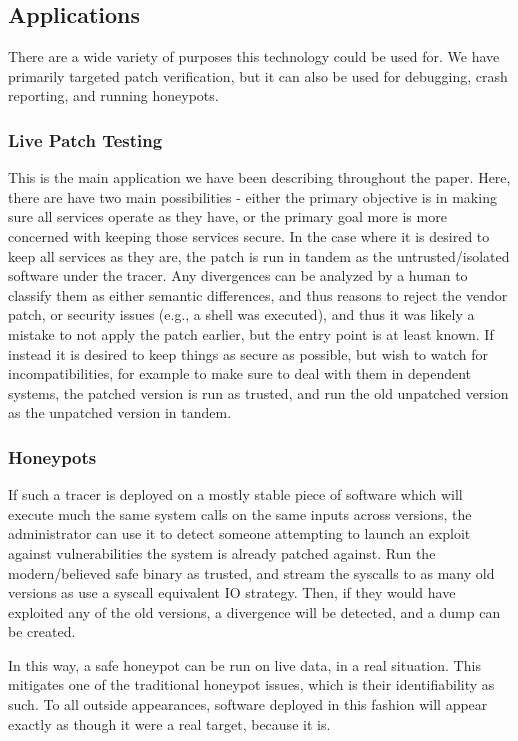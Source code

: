 \subsection{Applications}
\label{tach:sec:apps}
There are a wide variety of purposes this technology could be used for. We
have primarily targeted patch verification, but it can also be used for
debugging, crash reporting, and running honeypots.
\subsubsection{Live Patch Testing}
This is the main application we have been describing throughout the paper.
Here, there are have two main possibilities - either the primary
objective is in making sure all services operate as they have,
or the primary goal more is more concerned with keeping those services secure.
In the case where it is desired to keep all services as they are,
the patch is run in tandem as the untrusted/isolated software under the
tracer. Any divergences can be analyzed by a human to classify them
as either semantic differences, and thus reasons to reject the
vendor patch, or security issues (e.g., a shell was executed),
and thus it was likely a mistake to not apply the patch earlier, but
the entry point is at least known.
If instead it is desired to keep things as secure as possible, but wish
to watch for incompatibilities, for example to make sure to deal with them
in dependent systems, the patched version is run as trusted, and run
the old unpatched version as the unpatched version in tandem.
\subsubsection{Honeypots}
\label{tach:sec:honeypot}
If such a tracer is deployed on a mostly stable piece of software
which will execute much the same system calls on the same inputs across
versions, the administrator can use it to detect someone attempting to launch an
exploit against vulnerabilities the system is already patched against. Run the
modern/believed safe binary as trusted, and stream the syscalls to
as many old versions as use a syscall equivalent IO strategy. Then,
if they would have exploited any of the old versions, a divergence will
be detected, and a dump can be created.

In this way, a safe honeypot can be run on live data, in a real
situation. This mitigates one of the traditional honeypot issues, which
is their identifiability as such. To all outside appearances, software
deployed in this fashion will appear exactly as though it were a real
target, because it is.

